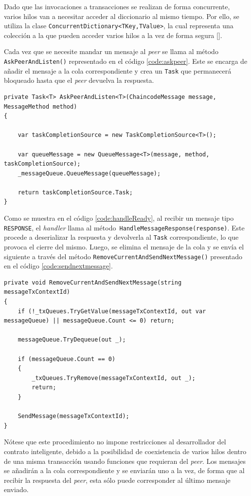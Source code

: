 Dado que las invocaciones a transacciones se realizan de forma concurrente, varios hilos van a necesitar acceder al diccionario al mismo tiempo. Por ello, se utiliza la clase \texttt{ConcurrentDictionary<TKey,TValue>}, la cual representa una colección a la que pueden acceder varios hilos a la vez de forma segura [\cite{microsoftdoc}].

Cada vez que se necesite mandar un mensaje al \textit{peer} se llama al método \texttt{AskPeerAndListen()} representado en el código \ref{code:askpeer}. Este se encarga de añadir el mensaje a la cola correspondiente y crea un \texttt{Task} que permanecerá bloqueado hasta que el \textit{peer} devuelva la respuesta. \\

\begin{lstlisting}[caption={Función \texttt{Handler.AspPeerAndListen<T>(...)}}, label={code:askpeer}]
private Task<T> AskPeerAndListen<T>(ChaincodeMessage message, MessageMethod method)
{

	var taskCompletionSource = new TaskCompletionSource<T>();
	
	var queueMessage = new QueueMessage<T>(message, method, taskCompletionSource);
	_messageQueue.QueueMessage(queueMessage);
	
	return taskCompletionSource.Task;
}
\end{lstlisting}


Como se muestra en el código \ref{code:handleReady}, al recibir un mensaje tipo \texttt{RESPONSE}, el \textit{handler} llama al método\texttt{ HandleMessageResponse(response)}. Este procede a deserializar la respuesta y devolverla al \texttt{Task} correspondiente, lo que provoca el cierre del mismo. Luego, se elimina el mensaje de la cola y se envía el siguiente a través del método 
\texttt{RemoveCurrentAndSendNextMessage()} presentado en el código \ref{code:sendnextmessage}.\\

\begin{lstlisting}[caption={Función \texttt{RemoveCurrentAndSendNextMessage(...)} }]
 private void RemoveCurrentAndSendNextMessage(string messageTxContextId)
{
    if (!_txQueues.TryGetValue(messageTxContextId, out var messageQueue) || messageQueue.Count <= 0) return;

    messageQueue.TryDequeue(out _);

    if (messageQueue.Count == 0)
    {
        _txQueues.TryRemove(messageTxContextId, out _);
        return;
    }

    SendMessage(messageTxContextId);
}
\end{lstlisting}

Nótese que este procedimiento no impone restricciones al desarrollador del contrato inteligente, debido a la posibilidad de coexistencia de varios hilos dentro de una misma transacción usando funciones que requieran del \textit{peer}. Los mensajes se añadirán a la cola correspondiente y se enviarán uno a la vez, de forma que al recibir la respuesta del \textit{peer}, esta sólo puede corresponder al último mensaje enviado.

